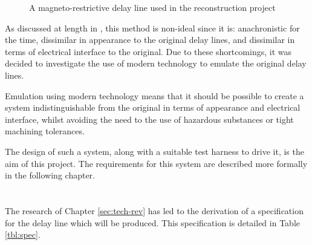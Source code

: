 \begin{figure}[ht]
	\centering
	\caption{A magneto-restrictive delay line used in the reconstruction project \cite{linnington2016}}
	\label{fig:nickel-delay}
\end{figure}

As discussed at length in \cite{tyler2017}, this method is non-ideal since it is: anachronistic for the time, dissimilar in appearance to the original delay lines, and dissimilar in terms of electrical interface to the original. Due to these shortcomings, it was decided to investigate the use of modern technology to emulate the original delay lines.

Emulation using modern technology means that it should be possible to create a system indistinguishable from the original in terms of appearance and electrical interface, whilst avoiding the need to the use of hazardous substances or tight machining tolerances.

The design of such a system, along with a suitable test harness to drive it, is the aim of this project. The requirements for this system are described more formally in the following chapter.

\chapter{} \label{sec:spec}

The research of Chapter \ref{sec:tech-rev} has led to the derivation of a specification for the delay line which will be produced. This specification is detailed in Table \ref{tbl:spec}.

